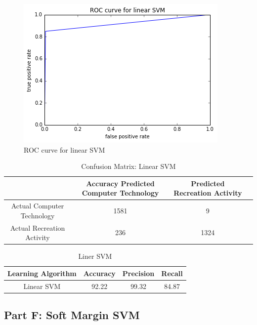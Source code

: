 \documentclass[11pt]{article}
\begin{document}
\begin{figure}[H]
	
		\includegraphics[width=\textwidth]{ROC_SVM.png}
	\caption{ROC curve for linear SVM}
\end{figure}

\begin{table}[h]
	\centering
	\begin{tabular}{|c|c|c|c|} \hline
		& Accuracy 		Predicted Computer Technology & Predicted Recreation Activity \\ \hline
		Actual Computer Technology & 1581 & 9 \\
		Actual Recreation Activity & 236& 1324  \\
		\hline
	\end{tabular}
	\caption{Confusion Matrix: Linear SVM}
	\label{table:ovr_res}
\end{table}

\begin{table}[h]
	\centering
	\begin{tabular}{|c|c|c|c|} \hline
		Learning Algorithm & Accuracy & Precision & Recall\\ \hline
		Linear SVM & 92.22 & 99.32 & 84.87 \\
		\hline
	\end{tabular}
	\caption{Liner SVM}
	\label{table:ovr_res}
\end{table}



\subsection{Part F: Soft Margin SVM}
\end{document}
